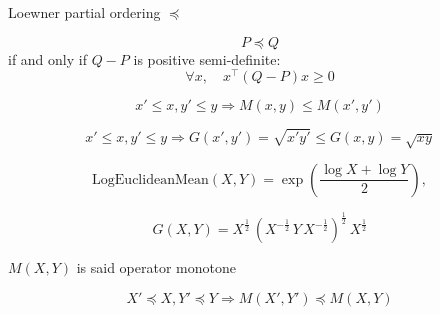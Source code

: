 \documentclass{article}
\def\LEM{\mathrm{LogEuclideanMean}}
\begin{document}
Loewner partial ordering $\preceq$


$$
P\preceq Q
$$ if and only if $Q-P$ is positive semi-definite: 
$$
\forall x,\quad x^\top (Q-P)x \geq 0
$$

$$
x'\leq x, y'\leq y \Rightarrow M(x,y)\leq M(x',y')
$$

$$
x'\leq x, y'\leq y \Rightarrow G(x',y')=\sqrt{x'y'}\leq  G(x,y)=\sqrt{xy}
$$


$$
\LEM(X,Y)=\exp\left(\frac{\log X+\log Y}{2}\right),
$$

$$
G(X,Y)=X^{\frac{1}{2}}\, (X^{-\frac{1}{2}}\, Y\, X^{-\frac{1}{2}})^{\frac{1}{2}}\, X^{\frac{1}{2}} 
$$


$M(X,Y)$ is said operator monotone 

$$
X'\preceq X, Y'\preceq Y \Rightarrow M(X',Y')\preceq M(X,Y)
$$
\end{document}
